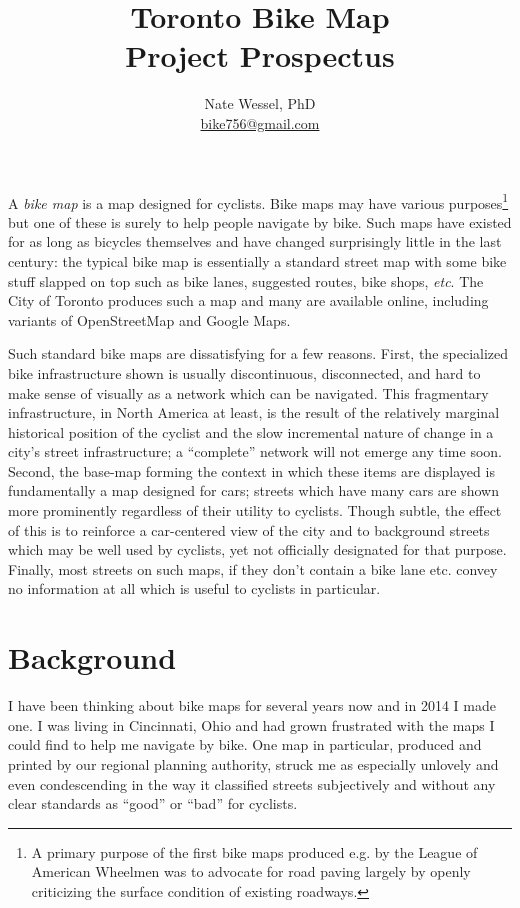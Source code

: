 \documentclass{article}
\title{Toronto Bike Map \\ Project Prospectus}
\author{Nate Wessel, PhD \\ \href{mailto:bike756@gmail.com}{bike756@gmail.com}}
\begin{document}
	\maketitle
	A \textit{bike map} is a map designed for cyclists. Bike maps may have various purposes\footnote{A primary purpose of the first bike maps produced e.g. by the League of American Wheelmen was to advocate for road paving largely by openly criticizing the surface condition of existing roadways.} but one of these is surely to help people navigate by bike. Such maps have existed for as long as bicycles themselves and have changed surprisingly little in the last century: the typical bike map is essentially a standard street map with some bike stuff slapped on top such as bike lanes, suggested routes, bike shops, \textit{etc}. 
	The City of Toronto produces such a map and many are available online, including variants of OpenStreetMap and Google Maps. 
	
	Such standard bike maps are dissatisfying for a few reasons. First, the specialized bike infrastructure shown is usually discontinuous, disconnected, and hard to make sense of visually as a network which can be navigated. This fragmentary infrastructure, in North America at least, is the result of the relatively marginal historical position of the cyclist and the slow incremental nature of change in a city's street infrastructure; a ``complete'' network will not emerge any time soon. 
	Second, the base-map forming the context in which these items are displayed is fundamentally a map designed for cars; streets which have many cars are shown more prominently regardless of their utility to cyclists. Though subtle, the effect of this is to reinforce a car-centered view of the city and to background streets which may be well used by cyclists, yet not officially designated for that purpose. Finally, most streets on such maps, if they don't contain a bike lane etc. convey no information at all which is useful to cyclists in particular. 
	
	\section*{Background}
		I have been thinking about bike maps for several years now and in 2014 I made one. 
		I was living in Cincinnati, Ohio and had grown frustrated with the maps I could find to help me navigate by bike. One map in particular, produced and printed by our regional planning authority, struck me as especially unlovely and even condescending in the way it classified streets subjectively and without any clear standards as ``good'' or ``bad'' for cyclists. 
		
\end{document}
